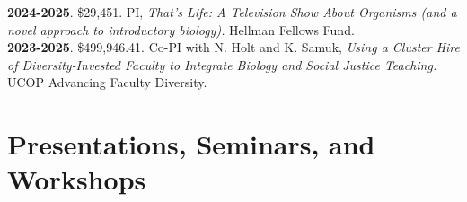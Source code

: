 \documentclass[]{article}
\begin{document}
\textbf{2024-2025}. \$29,451. PI, \textit{That's Life: A Television Show About Organisms (and a novel approach to introductory biology).} Hellman Fellows Fund.\\

\textbf{2023-2025}. \$499,946.41. Co-PI with N. Holt and K. Samuk, \textit{Using a Cluster Hire of Diversity‐Invested Faculty to Integrate Biology and Social Justice Teaching.} UCOP Advancing Faculty Diversity.\\


\vspace{1.5mm}

\section{\fontsize{16}{48}\selectfont Presentations, Seminars, and Workshops}


\renewcommand{\baselinestretch}{1.15}\normalsize
\end{document}
